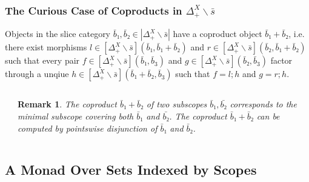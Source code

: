 \documentclass[aspectratio=169]{beamer}
\theoremstyle{remarkstyle}
\newtheorem*{remark}{Remark}
\begin{document}
\begin{frame}[fragile]
  \frametitle{The Curious Case of Coproducts in $Δ_+^X∖\bar{s}$}
  \begin{theorem}
    Objects in the slice category $\bar{b}₁, \bar{b}₂ ∈ |Δ_+^X∖\bar{s}|$ have a coproduct object $\bar{b}₁ + \bar{b}₂$, i.e. there exist morphisms $l ∈ [Δ_+^X∖\bar{s}](\bar{b}₁, \bar{b}₁ + \bar{b}₂)$ and $r ∈ [Δ_+^X∖\bar{s}](\bar{b}₂, \bar{b}₁ + \bar{b}₂)$ such that every pair $f ∈ [Δ_+^X∖\bar{s}](\bar{b}₁, \bar{b}_3)$ and $g ∈ [Δ_+^X∖\bar{s}](\bar{b}₂, \bar{b}_3)$ factor through a unqiue $h ∈ [Δ_+^X∖\bar{s}](\bar{b}₁ + \bar{b}₂, \bar{b}_3)$ such that $f = l;h$ and $g = r;h$.
  \end{theorem}
  \begin{columns}
    \begin{column}{0.5\textwidth}
      \begin{example}
      \end{example}
    \end{column}
    \begin{column}{0.46\textwidth}
      \begin{remark}
        The coproduct $\bar{b}₁ + \bar{b}₂$ of two subscopes $\bar{b}₁, \bar{b₂}$ 
        corresponds to the minimal subscope covering both $\bar{b}₁$ and $\bar{b₂}$. 
        The coproduct $\bar{b}₁ + \bar{b}₂$ can be computed by pointswise disjunction of $\bar{b}₁$ and $\bar{b}₂$. 
      \end{remark}
    \end{column}
  \end{columns}
\end{frame}

\subsection{A Monad Over Sets Indexed by Scopes}
\end{document}
